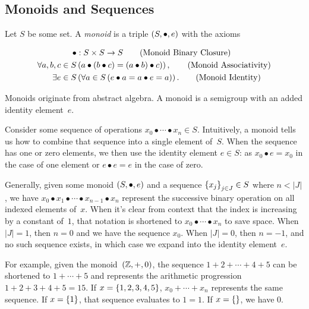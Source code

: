 \subsection{Monoids and Sequences}
\begin{definition}[Monoid]
  Let $S$ be some set.  A \emph{monoid} is a triple $\left({S},{\bullet},{e}\right)$
    with the axioms

  \begin{align}
    \bullet &: S\times S \rightarrow S
      \tag{Monoid Binary Closure} \\
    \Forall{a,b,c\in S&}{a\bullet(b\bullet c) = (a\bullet b)\bullet c)},
      \tag{Monoid Associativity} \\
    \Exists{e\in S&}{\Forall{a\in S}{e\bullet a = a\bullet e = a}}.
      \tag{Monoid Identity}\label{eq:monoid-identity}
  \end{align}
\end{definition}

Monoids originate from abstract algebra.
A monoid is a semigroup with an added identity element~$e$.

Consider some sequence of operations
  $x_0 \bullet\cdots\bullet x_n \in S$.
Intuitively,
  a monoid tells us how to combine that sequence into a single element
  of~$S$.
When the sequence has one or zero elements,
  we then use the identity element $e\in S$:
    as $x_0 \bullet e = x_0$ in the case of one element
    or $e \bullet e = e$ in the case of zero.

\indexsym{}
\begin{definition}
Generally,
  given some monoid $\left({S},{\bullet},{e}\right)$ and a sequence $\left\{x_{j}\right\}_{j\in J}\in S$
  where $n<|J|$,
    we have
    $x_0\bullet x_1\bullet\cdots\bullet x_{n-1}\bullet x_n$
    represent the successive binary operation on all indexed elements
    of~$x$.
When it's clear from context that the index is increasing by a constant
  of~$1$,
    that notation is shortened to $x_0\bullet\cdots\bullet x_n$ to save
    space.
When $|J|=1$, then $n=0$ and we have the sequence $x_0$.
When $|J|=0$, then $n=-1$,
  and no such sequence exists,
  in which case we expand into the identity element~$e$.
\end{definition}

For example,
  given the monoid~$\left({\mathbb{Z}},{+},{0}\right)$,
  the sequence $1+2+\cdots+4+5$ can be shortened to
    $1+\cdots+5$ and represents the arithmetic progression
    $1+2+3+4+5=15$.
If $x=\left\{1,2,3,4,5\right\}$,
  $x_0+\cdots+x_n$ represents the same sequence.
If $x=\left\{1\right\}$,
  that sequence evaluates to $1=1$.
If $x=\left\{\right\}$,
  we have $0$.


